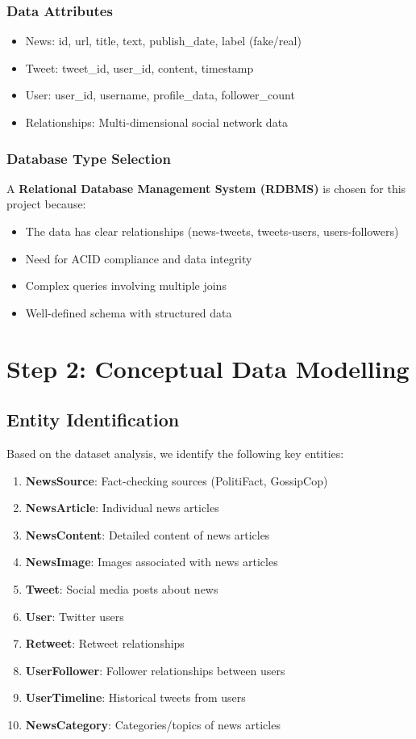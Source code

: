\documentclass[12pt,a4paper]{report}
\begin{document}
\subsection{Data Attributes}
\begin{itemize}
    \item News: id, url, title, text, publish\_date, label (fake/real)
    \item Tweet: tweet\_id, user\_id, content, timestamp
    \item User: user\_id, username, profile\_data, follower\_count
    \item Relationships: Multi-dimensional social network data
\end{itemize}

\subsection{Database Type Selection}
A \textbf{Relational Database Management System (RDBMS)} is chosen for this project because:
\begin{itemize}
    \item The data has clear relationships (news-tweets, tweets-users, users-followers)
    \item Need for ACID compliance and data integrity
    \item Complex queries involving multiple joins
    \item Well-defined schema with structured data
\end{itemize}

\chapter{Step 2: Conceptual Data Modelling}

\section{Entity Identification}

Based on the dataset analysis, we identify the following key entities:

\begin{enumerate}
    \item \textbf{NewsSource}: Fact-checking sources (PolitiFact, GossipCop)
    \item \textbf{NewsArticle}: Individual news articles
    \item \textbf{NewsContent}: Detailed content of news articles
    \item \textbf{NewsImage}: Images associated with news articles
    \item \textbf{Tweet}: Social media posts about news
    \item \textbf{User}: Twitter users
    \item \textbf{Retweet}: Retweet relationships
    \item \textbf{UserFollower}: Follower relationships between users
    \item \textbf{UserTimeline}: Historical tweets from users
    \item \textbf{NewsCategory}: Categories/topics of news articles
\end{enumerate}
\end{document}
